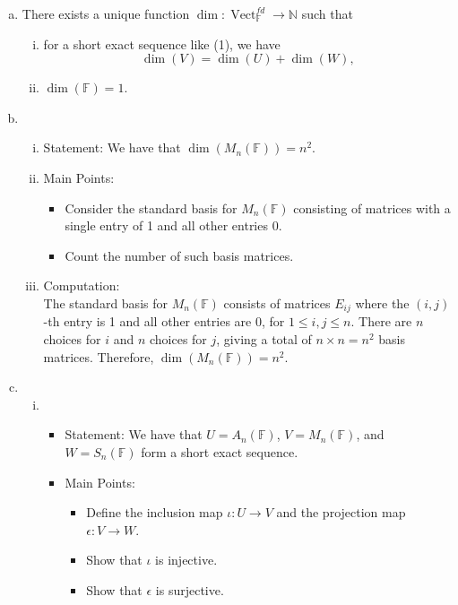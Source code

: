 \documentclass{article}
\begin{document}
\begin{enumerate}[a)]
    \item There exists a unique function $\dim: \operatorname{Vect}_{\mathbb{F}}^{fd} \to \mathbb{N}$ such that
    \begin{enumerate}[i)]
        \item for a short exact sequence like (1), we have
        \[
            \dim(V) = \dim(U) + \dim(W),
        \]
        \item $\dim(\mathbb{F}) = 1$.
    \end{enumerate}

    \item \begin{enumerate}[i)]
        \item Statement: We have that $\dim(M_n(\mathbb{F})) = n^2$.
        \item Main Points:
        \begin{itemize}
            \item Consider the standard basis for $M_n(\mathbb{F})$ consisting of matrices with a single entry of 1 and all other entries 0.
            \item Count the number of such basis matrices.
        \end{itemize}
        \item Computation: \\
        The standard basis for $M_n(\mathbb{F})$ consists of matrices $E_{ij}$ where the $(i,j)$-th entry is 1 and all other entries are 0, for $1 \leq i,j \leq n$. There are $n$ choices for $i$ and $n$ choices for $j$, giving a total of $n \times n = n^2$ basis matrices. Therefore, $\dim(M_n(\mathbb{F})) = n^2$.
    \end{enumerate}
    \item \begin{enumerate}[i)]
        \item \begin{itemize}
            \item Statement: We have that $U = A_n(\mathbb{F})$, $V = M_n(\mathbb{F})$, and $W = S_n(\mathbb{F})$ form a short exact sequence.
            \item Main Points:
            \begin{itemize}
                \item Define the inclusion map $\iota: U \to V$ and the projection map $\epsilon: V \to W$.
                \item Show that $\iota$ is injective.
                \item Show that $\epsilon$ is surjective.

\end{itemize}
\end{itemize}
\end{enumerate}
\end{enumerate}
\end{document}
